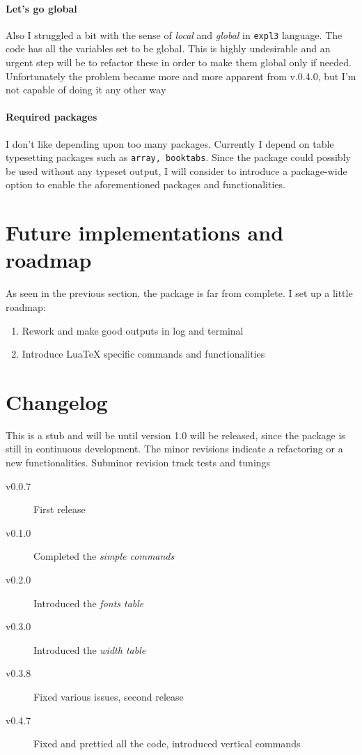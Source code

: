 \documentclass{article}
\begin{document}
\paragraph{Let’s go global} Also I struggled a bit with the sense of \emph{local} and \emph{global} in \texttt{expl3} language. The code has all the variables set to be global. This is highly undesirable and an urgent step will be to refactor these in order to make them global only if needed. Unfortunately the problem became more and more apparent from v.0.4.0, but I’m not capable of doing it any other way

\paragraph{Required packages} I don’t like depending upon too many packages. Currently I depend on table typesetting packages such as \texttt{array, booktabs}. Since the package could possibly be used without any typeset output, I will consider to introduce a package-wide option to enable the aforementioned packages and functionalities.


\section{Future implementations and roadmap}
As seen in the previous section, the package is far from complete. I set up a little roadmap:
\begin{enumerate}
\item Rework and make good outputs in log and terminal
\item Introduce Lua\TeX{} specific commands and functionalities 
\end{enumerate}
\section{Changelog}
This is a stub and will be until version 1.0 will be released, since the package is still in continuous development. The minor revisions indicate a refactoring or a new functionalities. Subminor revision track tests and tunings
\begin{description}
\item[v0.0.7] First release
\item[v0.1.0]  Completed the \emph{simple commands}
\item[v0.2.0] Introduced the \emph{fonts table}
\item[v0.3.0] Introduced the \emph{width table}
\item[v0.3.8] Fixed various issues, second release
\item[v0.4.7] Fixed and prettied all the code, introduced vertical commands
\end{description}
\end{document}
